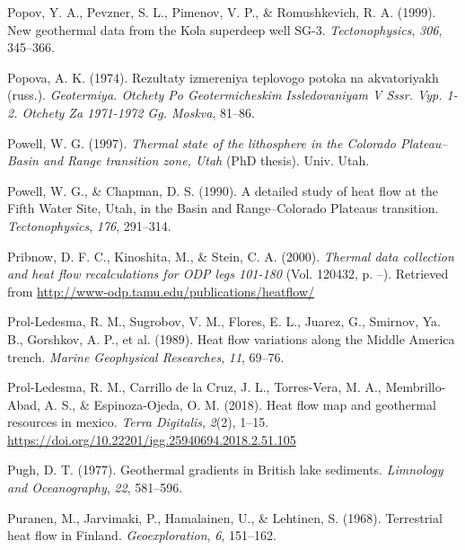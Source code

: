 \documentclass[draft,linenumbers]{agujournal2018}
\begin{document}
\leavevmode{}%
Popov, Y. A., Pevzner, S. L., Pimenov, V. P., \& Romushkevich, R. A.
(1999). New geothermal data from the {Kola} superdeep well {SG-3}.
\emph{Tectonophysics}, \emph{306}, 345--366.

\leavevmode{}%
Popova, A. K. (1974). Rezultaty izmereniya teplovogo potoka na
akvatoriyakh (russ.). \emph{Geotermiya. Otchety Po Geotermicheskim
Issledovaniyam V Sssr. Vyp. 1-2. Otchety Za 1971-1972 Gg. Moskva},
81--86.

\leavevmode{}%
Powell, W. G. (1997). \emph{Thermal state of the lithosphere in the
{Colorado Plateau--Basin and Range} transition zone, {Utah}} (PhD
thesis). Univ. Utah.

\leavevmode{}%
Powell, W. G., \& Chapman, D. S. (1990). A detailed study of heat flow
at the {Fifth Water Site, Utah}, in the {Basin and Range--Colorado
Plateaus} transition. \emph{Tectonophysics}, \emph{176}, 291--314.

\leavevmode{}%
Pribnow, D. F. C., Kinoshita, M., \& Stein, C. A. (2000). \emph{Thermal
data collection and heat flow recalculations for ODP legs 101-180} (Vol.
120432, p. --). Retrieved from
\url{http://www-odp.tamu.edu/publications/heatflow/}

\leavevmode{}%
Prol-Ledesma, R. M., Sugrobov, V. M., Flores, E. L., Juarez, G.,
Smirnov, Ya. B., Gorshkov, A. P., et al. (1989). Heat flow variations
along the {Middle America} trench. \emph{Marine Geophysical Researches},
\emph{11}, 69--76.

\leavevmode{}%
Prol-Ledesma, R. M., Carrillo de la Cruz, J. L., Torres-Vera, M. A.,
Membrillo-Abad, A. S., \& Espinoza-Ojeda, O. M. (2018). Heat flow map
and geothermal resources in mexico. \emph{Terra Digitalis}, \emph{2}(2),
1--15. \url{https://doi.org/10.22201/igg.25940694.2018.2.51.105}

\leavevmode{}%
Pugh, D. T. (1977). Geothermal gradients in {British} lake sediments.
\emph{Limnology and Oceanography}, \emph{22}, 581--596.

\leavevmode{}%
Puranen, M., Jarvimaki, P., Hamalainen, U., \& Lehtinen, S. (1968).
Terrestrial heat flow in {Finland}. \emph{Geoexploration}, \emph{6},
151--162.
\end{document}
